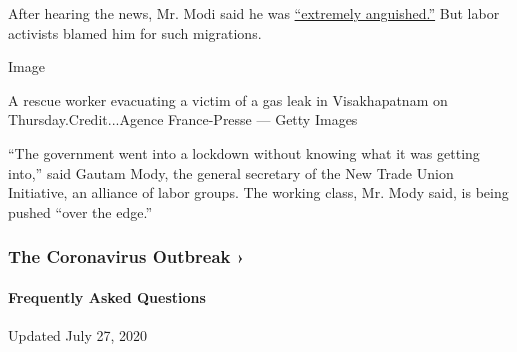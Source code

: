 After hearing the news, Mr. Modi said he was
\href{https://twitter.com/narendramodi/status/1258597915536179201}{``extremely
anguished.''} But labor activists blamed him for such migrations.

Image

A rescue worker evacuating a victim of a gas leak in Visakhapatnam on
Thursday.Credit...Agence France-Presse --- Getty Images

``The government went into a lockdown without knowing what it was
getting into,'' said Gautam Mody, the general secretary of the New Trade
Union Initiative, an alliance of labor groups. The working class, Mr.
Mody said, is being pushed ``over the edge.''

\href{https://www.nytimes.com/news-event/coronavirus?action=click\&pgtype=Article\&state=default\&region=MAIN_CONTENT_3\&context=storylines_faq}{}

\hypertarget{the-coronavirus-outbreak-}{%
\subsubsection{The Coronavirus Outbreak
›}\label{the-coronavirus-outbreak-}}

\hypertarget{frequently-asked-questions}{%
\paragraph{Frequently Asked
Questions}\label{frequently-asked-questions}}

Updated July 27, 2020

